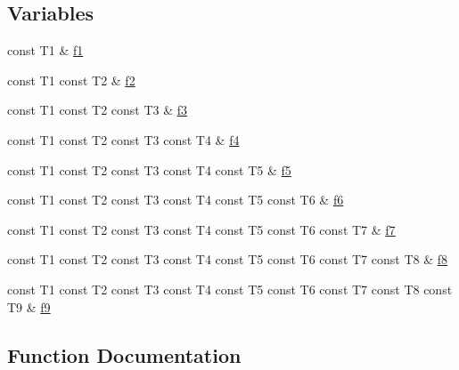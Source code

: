 \subsection*{Variables}
\begin{DoxyCompactItemize}
\item 
const T1 \& \hyperlink{namespacestd_1_1tr1_a9c0fa65b105f8e2f58ba59ecf75fd000}{f1}
\item 
const T1 const T2 \& \hyperlink{namespacestd_1_1tr1_a87dd9e009868361317f587126dba63d4}{f2}
\item 
const T1 const T2 const T3 \& \hyperlink{namespacestd_1_1tr1_a0f7c3b47d27d42d82d1a333ea420ce4e}{f3}
\item 
const T1 const T2 const T3 const T4 \& \hyperlink{namespacestd_1_1tr1_adc796e02b7385d526aff708189564f67}{f4}
\item 
const T1 const T2 const T3 const T4 const T5 \& \hyperlink{namespacestd_1_1tr1_a9c1eb66b2b2fa321942af95405232a0d}{f5}
\item 
const T1 const T2 const T3 const T4 const T5 const T6 \& \hyperlink{namespacestd_1_1tr1_a6b62f32e1e3e21bceb94eb46c4cbfd56}{f6}
\item 
const T1 const T2 const T3 const T4 const T5 const T6 const T7 \& \hyperlink{namespacestd_1_1tr1_a2185f3a1c07f2df072c39cb91ffa89a4}{f7}
\item 
const T1 const T2 const T3 const T4 const T5 const T6 const T7 const T8 \& \hyperlink{namespacestd_1_1tr1_ab998afa41cea8d6d26d7e4288b0bf974}{f8}
\item 
const T1 const T2 const T3 const T4 const T5 const T6 const T7 const T8 const T9 \& \hyperlink{namespacestd_1_1tr1_a216d2c7cdfaaf415caba2f88e2c34413}{f9}
\end{DoxyCompactItemize}


\subsection{Function Documentation}
